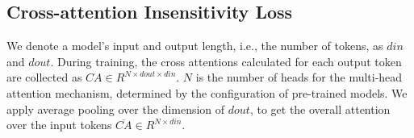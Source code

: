 




\subsection{Cross-attention Insensitivity Loss}
\label{sec:insloss}








We denote a model's input and output length, i.e., the number of tokens, as $din$ and $dout$.
During training, the cross attentions calculated for each output token are collected as $CA\in R^{N\times dout \times din}$. $N$ is the number of heads for the multi-head attention mechanism, determined by the configuration of pre-trained models. We apply average pooling over the dimension of $dout$, to get the overall attention over the input tokens $\overline{CA}\in R^{N\times din}$.

